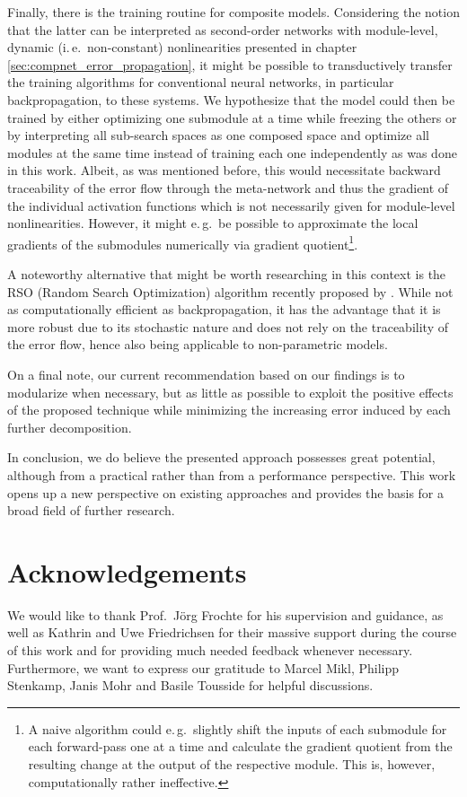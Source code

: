 Finally, there is the training routine for composite models. Considering the notion that the latter can be interpreted as second-order networks with module-level, dynamic (i.\,e.\ non-constant) nonlinearities presented in chapter \ref{sec:compnet_error_propagation}, it might be possible to transductively transfer the training algorithms for conventional neural networks, in particular backpropagation, to these systems. We hypothesize that the model could then be trained by either optimizing one submodule at a time while freezing the others or by interpreting all sub-search spaces as one composed space and optimize all modules at the same time instead of training each one independently as was done in this work. Albeit, as was mentioned before, this would necessitate backward traceability of the error flow through the meta-network and thus the gradient of the individual activation functions which is not necessarily given for module-level nonlinearities. However, it might e.\,g.\ be possible to approximate the local gradients of the submodules numerically via gradient quotient\footnote{A naive algorithm could e.\,g.\ slightly shift the inputs of each submodule for each forward-pass one at a time and calculate the gradient quotient from the resulting change at the output of the respective module. This is, however, computationally rather ineffective.}.

A noteworthy alternative that might be worth researching in this context is the RSO (Random Search Optimization) algorithm recently proposed by \cite{Tripathi2020-gc}. While not as computationally efficient as backpropagation, it has the advantage that it is more robust due to its stochastic nature and does not rely on the traceability of the error flow, hence also being applicable to non-parametric models.

On a final note, our current recommendation based on our findings is to modularize when necessary, but as little as possible to exploit the positive effects of the proposed technique while minimizing the increasing error induced by each further decomposition.

In conclusion, we do believe the presented approach possesses great potential, although from a practical rather than from a performance perspective. This work opens up a new perspective on existing approaches and provides the basis for a broad field of further research.

\cleardoublepage

\section{Acknowledgements}

We would like to thank Prof.\ Jörg Frochte for his supervision and guidance, as well as Kathrin and Uwe Friedrichsen for their massive support during the course of this work and for providing much needed feedback whenever necessary. Furthermore, we want to express our gratitude to Marcel Mikl, Philipp Stenkamp, Janis Mohr and Basile Tousside for helpful discussions.